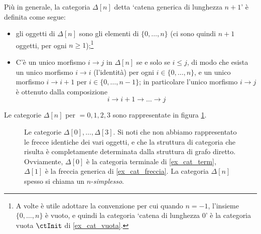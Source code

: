 \begin{example}\label{ex_cat_catena}
	Più in generale, la categoria \(\Delta[n]\) detta `catena generica di lunghezza \(n+1\)' è definita come segue:
	\begin{itemize}
		\item gli oggetti di \(\Delta[n]\) sono gli elementi di \(\{0,\dots,n\}\) (ci sono quindi \(n+1\) oggetti, per ogni \(n\ge 1\));\footnote{A volte è utile adottare la convenzione per cui quando \(n=-1\), l'insieme \(\{0,\dots,n\}\) è vuoto, e quindi la categoria `catena di lunghezza \(0\)' è la categoria vuota \(\ctInit\) di \ref{ex_cat_vuota}.}
		\item C'è un unico morfismo \(i\to j\) in \(\Delta[n]\) se e solo se \(i\le j\), di modo che esista un unico morfismo \(i\to i\) (l'identità) per ogni \(i\in\{0,\dots,n\}\), e un unico morfismo \(i\to i+1\) per \(i\in\{0,\dots,n-1\}\); in particolare l'unico morfismo \(i\to j\) è ottenuto dalla composizione
		      \[i\to i+1\to\dots\to j\]
	\end{itemize}
	Le categorie \(\Delta[n]\) per \(=0,1,2,3\) sono rappresentate in figura \ref{fig:le_delta}.
	\begin{figure}[h]
		\begin{center}
		\end{center}
		\caption{Le categorie \(\Delta[0], \dots,\Delta[3]\). Si noti che non abbiamo rappresentato le frecce identiche dei vari oggetti, e che la struttura di categoria che risulta è completamente determinata dalla struttura di grafo diretto. Ovviamente, \(\Delta[0]\) è la categoria terminale di \ref{ex_cat_term}, \(\Delta[1]\) è la freccia generica di \ref{ex_cat_freccia}. La categoria \(\Delta[n]\) spesso si chiama un \(n\)-\emph{simplesso}.}
		\label{fig:le_delta}
	\end{figure}
\end{example}
